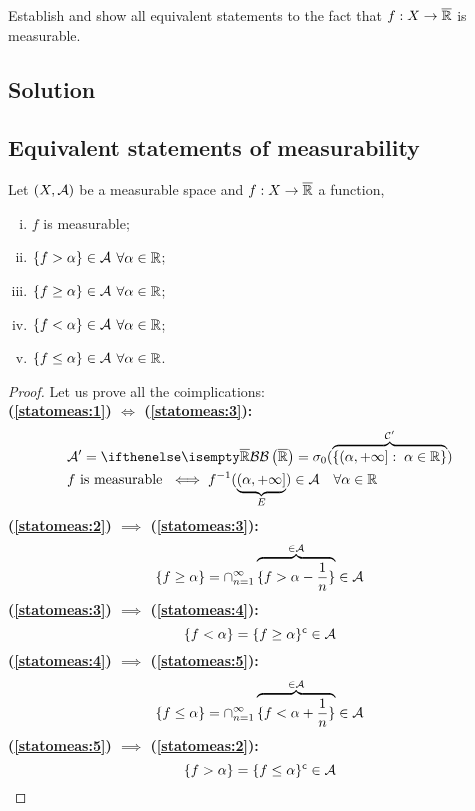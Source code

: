 

\question

Establish and show all equivalent statements to the fact that $f : X \to \overline{\mathbb{R}}$ is measurable.

\subsection*{Solution}

\subsection{Equivalent statements of measurability}
Let $(X,\mathcal{A})$ be a measurable space and $f:X\to\overline{\mathbb{R}}$ a function, \tfae

\begin{enumerate}[i)]
    \item \label{statomeas:1} $f$ is measurable;
    \item \label{statomeas:2} $\{ f>\alpha \}\in\mathcal{A}$ $\forall\alpha\in\mathbb{R}$;
    \item \label{statomeas:3} $\{ f\geq\alpha \}\in\mathcal{A}$ $\forall\alpha\in\mathbb{R}$;
    \item \label{statomeas:4} $\{ f<\alpha \}\in\mathcal{A}$ $\forall\alpha\in\mathbb{R}$;
    \item \label{statomeas:5} $\{ f\leq\alpha \}\in\mathcal{A}$ $\forall\alpha\in\mathbb{R}$.
\end{enumerate}

\begin{proof}
    Let us prove all the coimplications:\\
    \textbf{(\ref{statomeas:1}) $\iff$ (\ref{statomeas:3}):}
    \begin{align*}
         & \A'=\B[\Rcomp]=\sigma_0( \overbrace{ \{(\alpha,+\infty]:\; \alpha\in\R\} }^{\mathcal{C}'} )                   \\
         & f \text{ is measurable } \iff f^{-1} ( \underbrace{(\alpha,+\infty]}_{E} ) \in \A \quad \forall \alpha \in \R
    \end{align*}
    \textbf{(\ref{statomeas:2}) $\implies$ (\ref{statomeas:3}):}
    \[
        \{ f\geq \alpha \} = \cap_{n=1}^\infty \overbrace{\{ f > \alpha-\frac{1}{n} \}}^{\in\mathcal{A}} \in\mathcal{A}
    \]
    \textbf{(\ref{statomeas:3}) $\implies$ (\ref{statomeas:4}):}
    \[
        \{ f<\alpha \} = \{ f\geq\alpha \}^{\mathsf{c}} \in\mathcal{A}
    \]
    \textbf{(\ref{statomeas:4}) $\implies$ (\ref{statomeas:5}):}
    \[
        \{ f \leq \alpha \} = \cap_{n=1}^\infty \overbrace{\{ f < \alpha+\frac{1}{n} \}}^{\in\mathcal{A}} \in\mathcal{A}
    \]
    \textbf{(\ref{statomeas:5}) $\implies$ (\ref{statomeas:2}):}
    \[
        \{ f>\alpha \} = \{ f\leq\alpha \}^{\mathsf{c}} \in\mathcal{A}
    \]
\end{proof}